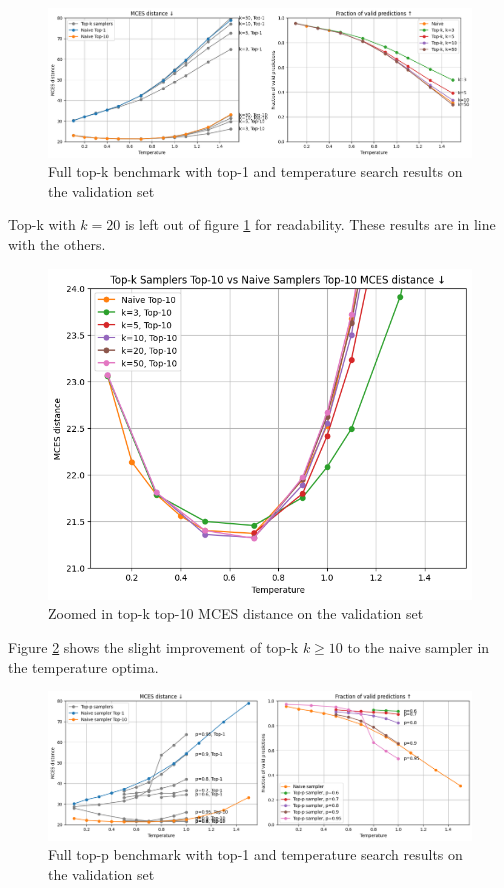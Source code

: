 \begin{figure}[h]
    \centering
    \includegraphics[width=\linewidth]{figures/appendix/samplers/top-k_vs_naive.png}
    \caption{Full top-k benchmark with top-1 and temperature search results on the validation set}
    \label{fig:top-k_appendix}
\end{figure}

Top-k with $k=20$ is left out of figure \ref{fig:top-k_appendix} for readability. These results are in line with the others.

\begin{figure}[h]
    \centering
    \includegraphics[width=0.6\linewidth]{figures/appendix/samplers/top-k_vs_naive_top-10.png}
    \caption{Zoomed in top-k top-10 MCES distance on the validation set}
    \label{fig:top-k_zoomed_appendix}
\end{figure}

Figure \ref{fig:top-k_zoomed_appendix} shows the slight improvement of top-k $k\geq 10$ to the naive sampler in the temperature optima.

\begin{figure}[h]
    \centering
    \includegraphics[width=\linewidth]{figures/appendix/samplers/top-p_vs_naive.png}
    \caption{Full top-p benchmark with top-1 and temperature search results on the validation set}
    \label{fig:top-p_appendix}
\end{figure}

